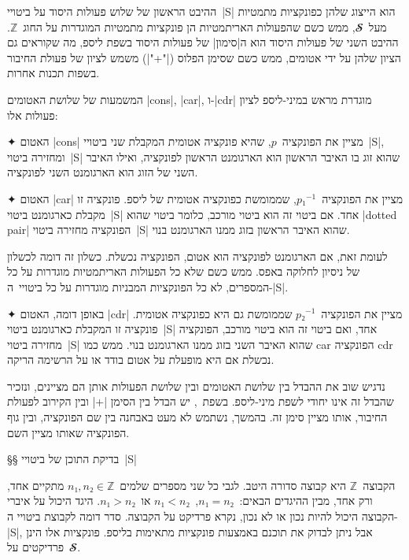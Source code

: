 ההיבט הראשון של שלוש פעולות היסוד על ביטויי~\E|S| הוא הייצוג שלהן כפונקציות
מתמטיות מעל~$𝓢$, ממש כשם שהפעולות האריתמטיות הן פונקציות מתמטיות המוגדרות על
החוג~$ℤ$. ההיבט השני של פעולות היסוד הוא ה\ע|סימון| של פעולות היסוד בשפת ליספ,
מה שקוראים גם הציון שלהן על ידי אטומים, ממש כשם שסימן הפלוס (\T|"+"|) משמש
לציון של פעולת החיבור בשפות תכנות אחרות.

המשמעות של שלושת האטומים \T|cons|, \T|car|, ו-\T|cdr| מוגדרת מראש במיני-ליספ
לציון פעולות אלו:

\begin{enumerate}
  ✦ האטום \T|cons| מציין את הפונקציה~$p$, שהיא פונקציה אטומית המקבלת שני
  ביטויי~\E|S|, ומחזירה ביטוי~\E|S| שהוא זוג בו האיבר הראשון הוא הארגומנט
  הראשון לפונקציה, ואילו האיבר השני של הזוג הוא הארגומנט השני לפונקציה.

  ✦ האטום \T|car| מציין את הפונקציה~$p₁^{-1}$, שממומשת כפונקציה אטומית של
  ליספ. פונקציה זו מקבלת כארגומנט ביטוי~\E|S| אחד. אם ביטוי זה הוא ביטוי מורכב,
  כלומר ביטוי שהוא \E|dotted pair| הפונקציה מחזירה ביטוי~\E|S| שהוא האיבר
  הראשון בזוג ממנו הארגומנט בנוי.

  לעומת זאת, אם הארגומנט לפונקציה הוא אטום, הפונקציה נכשלת. כשלון זה דומה
  לכשלון של ניסיון לחלוקה באפס. ממש כשם שלא כל הפעולות האריתמטיות מוגדרות על כל
  המספרים, לא כל הפונקציות המבניות מוגדרות על כל ביטויי~ה-\E|S|.

  ✦ באופן דומה, האטום \T|cdr| מציין את הפונקציה~$p₂^{-1}$ שממומשת גם היא
  כפונקציה אטומית. פונקציה זו המקבלת כארגומנט ביטוי~\E|S| אחד, ואם ביטוי זה
  הוא ביטוי מורכב, הפונקציה מחזירה ביטוי~\E|S| שהוא האיבר השני בזוג ממנו
  הארגומנט בנוי. ממש כמו car הפונקציה cdr נכשלת אם היא מופעלת על אטום בודד
  או על הרשימה הריקה.
\end{enumerate}

נדגיש שוב את ההבדל בין שלושת האטומים ובין שלושת הפעולות אותן הם מציינים, ונזכיר
שהבדל זה אינו יחודי לשפת מיני-ליספ. בשפת~\CPL, יש הבדל בין הסימן \T|+| ובין
הקירוב לפעולת החיבור, אותו מציין סימן זה. בהמשך, נשתמש לא מעט באבחנה בין שם
הפונקציה, ובין גוף הפונקציה שאותו מציין השם.

§§ בדיקת התוכן של ביטויי~\E|S|

הקבוצה~$ℤ$ היא קבוצה סדורה היטב. לגבי כל שני מספרים שלמים~$n₁,n₂∈ℤ$
מתקיים אחד, ורק אחד, מבין ההיגדים הבאים:~$n₁=n₂$,~$n₁<n₂$ או~$n₁>n₂$. היגד
היכול על איברי הקבוצה היכול להיות נכון או לא נכון, נקרא פרדיקט על הקבוצה.
סדר דומה לקבוצת ביטויי ה-\E|S|, אבל ניתן לבדוק את תוכנם באמצעות פונקציות
מתאימות בליספ. פונקציות אלו הינן פרדיקטים על~$𝓢$.

